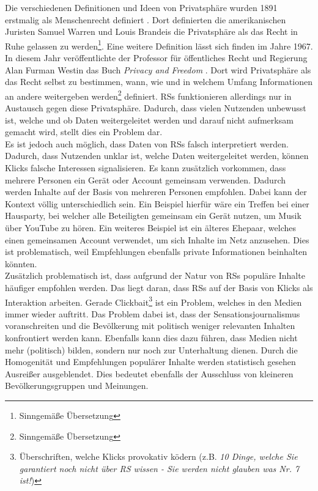 Die verschiedenen Definitionen und Ideen von Privatsphäre wurden 1891 erstmalig als Menschenrecht definiert \cite{history-of-privacy}.
Dort definierten die amerikanischen Juristen Samuel Warren und Louis Brandeis die Privatsphäre als \glqq das Recht in Ruhe gelassen zu werden\grqq{}\footnote{Sinngemäße Übersetzung}.
Eine weitere Definition lässt sich finden im Jahre 1967.
In diesem Jahr veröffentlichte der Professor für öffentliches Recht und Regierung Alan Furman Westin das Buch \textit{Privacy and Freedom} \cite{privacy-and-freedom}.
Dort wird Privatsphäre als \glqq das Recht selbst zu bestimmen, wann, wie und in welchem Umfang Informationen an andere weitergeben werden\grqq{}\footnote{Sinngemäße Übersetzung} definiert.
\acp{RS} funktionieren allerdings nur in Austausch gegen diese Privatsphäre.
Dadurch, dass vielen Nutzenden unbewusst ist, welche und ob Daten weitergeleitet werden und darauf nicht aufmerksam gemacht wird, stellt dies ein Problem dar. \\

Es ist jedoch auch möglich, dass Daten von \acp{RS} falsch interpretiert werden.
Dadurch, dass Nutzenden unklar ist, welche Daten weitergeleitet werden, können Klicks falsche Interessen signalisieren.
Es kann zusätzlich vorkommen, dass mehrere Personen ein Gerät oder Account gemeinsam verwenden.
Dadurch werden Inhalte auf der Basis von mehreren Personen empfohlen.
Dabei kann der Kontext völlig unterschiedlich sein.
Ein Beispiel hierfür wäre ein Treffen bei einer Hausparty, bei welcher alle Beteiligten gemeinsam ein Gerät nutzen, um Musik über YouTube zu hören.
Ein weiteres Beispiel ist ein älteres Ehepaar, welches einen gemeinsamen Account verwendet, um sich Inhalte im Netz anzusehen.
Dies ist problematisch, weil Empfehlungen ebenfalls private Informationen beinhalten könnten. \\

Zusätzlich problematisch ist, dass aufgrund der Natur von \acp{RS} populäre Inhalte häufiger empfohlen werden.
Das liegt daran, dass \acp{RS} auf der Basis von Klicks als Interaktion arbeiten.
Gerade Clickbait\footnote{Überschriften, welche Klicks provokativ ködern (z.B. \textit{10 Dinge, welche Sie garantiert noch nicht über \ac{RS} wissen - Sie werden nicht glauben was Nr. 7 ist!})} ist ein Problem, welches in den Medien immer wieder auftritt.
Das Problem dabei ist, dass der Sensationsjournalismus voranschreiten und die Bevölkerung mit politisch weniger relevanten Inhalten konfrontiert werden kann.
Ebenfalls kann dies dazu führen, dass Medien nicht mehr (politisch) bilden, sondern nur noch zur Unterhaltung dienen.
Durch die Homogenität und Empfehlungen populärer Inhalte werden statistisch gesehen Ausreißer ausgeblendet.
Dies bedeutet ebenfalls der Ausschluss von kleineren Bevölkerungsgruppen und Meinungen. \\

